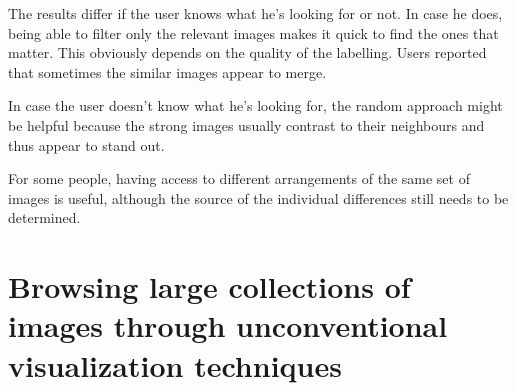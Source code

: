The results differ if the user knows what he's looking for or not. In case he does, being able to filter only the relevant images makes it quick to find the ones that matter. This obviously depends on the quality of the labelling. Users reported that sometimes the similar images appear to merge.

In case the user doesn't know what he's looking for, the random approach might be helpful because the strong images usually contrast to their neighbours and thus appear to stand out.

For some people, having access to different arrangements of the same set of images is useful, although the source of the individual differences still needs to be determined.


\newpage
\section{Browsing large collections of images through unconventional visualization techniques} %
\label{sub:Porta}

